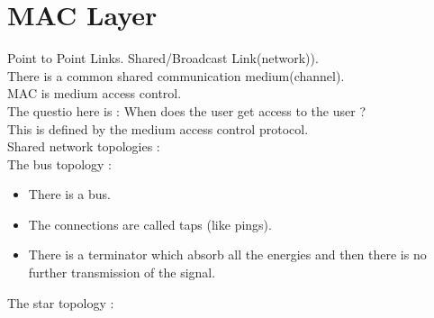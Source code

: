 \documentclass[solution,addpoints,12pt]{exam}
\begin{document}
\section{MAC Layer}
Point to Point Links. Shared/Broadcast Link(network)).\\
There is a common shared communication medium(channel).\\
MAC is medium access control.\\
The questio here is : When does the user get access
to the user ?\\
This is defined by the medium access control protocol.\\

Shared network topologies :\\
The bus topology :\\
\begin{itemize}
\item There is a bus.
\item The connections are called taps (like pings).
\item There is a terminator which absorb all the energies
and then there is no further transmission of the signal.
\end{itemize}
The star topology :\\
\end{document}

